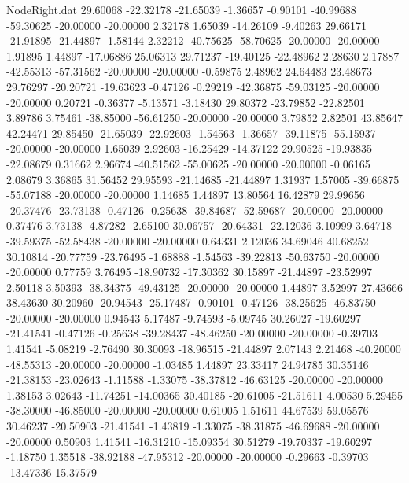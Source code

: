 \begin{filecontents}{NodeRight.dat}
  29.60068  -22.32178  -21.65039    -1.36657   -0.90101  -40.99688  -59.30625  -20.00000  -20.00000    2.32178    1.65039  -14.26109   -9.40263
  29.66171  -21.91895  -21.44897    -1.58144    2.32212  -40.75625  -58.70625  -20.00000  -20.00000    1.91895    1.44897  -17.06886   25.06313
  29.71237  -19.40125  -22.48962     2.28630    2.17887  -42.55313  -57.31562  -20.00000  -20.00000   -0.59875    2.48962   24.64483   23.48673
  29.76297  -20.20721  -19.63623    -0.47126   -0.29219  -42.36875  -59.03125  -20.00000  -20.00000    0.20721   -0.36377   -5.13571   -3.18430
  29.80372  -23.79852  -22.82501     3.89786    3.75461  -38.85000  -56.61250  -20.00000  -20.00000    3.79852    2.82501   43.85647   42.24471
  29.85450  -21.65039  -22.92603    -1.54563   -1.36657  -39.11875  -55.15937  -20.00000  -20.00000    1.65039    2.92603  -16.25429  -14.37122
  29.90525  -19.93835  -22.08679     0.31662    2.96674  -40.51562  -55.00625  -20.00000  -20.00000   -0.06165    2.08679    3.36865   31.56452
  29.95593  -21.14685  -21.44897     1.31937    1.57005  -39.66875  -55.07188  -20.00000  -20.00000    1.14685    1.44897   13.80564   16.42879
  29.99656  -20.37476  -23.73138    -0.47126   -0.25638  -39.84687  -52.59687  -20.00000  -20.00000    0.37476    3.73138   -4.87282   -2.65100
  30.06757  -20.64331  -22.12036     3.10999    3.64718  -39.59375  -52.58438  -20.00000  -20.00000    0.64331    2.12036   34.69046   40.68252
  30.10814  -20.77759  -23.76495    -1.68888   -1.54563  -39.22813  -50.63750  -20.00000  -20.00000    0.77759    3.76495  -18.90732  -17.30362
  30.15897  -21.44897  -23.52997     2.50118    3.50393  -38.34375  -49.43125  -20.00000  -20.00000    1.44897    3.52997   27.43666   38.43630
  30.20960  -20.94543  -25.17487    -0.90101   -0.47126  -38.25625  -46.83750  -20.00000  -20.00000    0.94543    5.17487   -9.74593   -5.09745
  30.26027  -19.60297  -21.41541    -0.47126   -0.25638  -39.28437  -48.46250  -20.00000  -20.00000   -0.39703    1.41541   -5.08219   -2.76490
  30.30093  -18.96515  -21.44897     2.07143    2.21468  -40.20000  -48.55313  -20.00000  -20.00000   -1.03485    1.44897   23.33417   24.94785
  30.35146  -21.38153  -23.02643    -1.11588   -1.33075  -38.37812  -46.63125  -20.00000  -20.00000    1.38153    3.02643  -11.74251  -14.00365
  30.40185  -20.61005  -21.51611     4.00530    5.29455  -38.30000  -46.85000  -20.00000  -20.00000    0.61005    1.51611   44.67539   59.05576
  30.46237  -20.50903  -21.41541    -1.43819   -1.33075  -38.31875  -46.69688  -20.00000  -20.00000    0.50903    1.41541  -16.31210  -15.09354
  30.51279  -19.70337  -19.60297    -1.18750    1.35518  -38.92188  -47.95312  -20.00000  -20.00000   -0.29663   -0.39703  -13.47336   15.37579

\end{filecontents}
